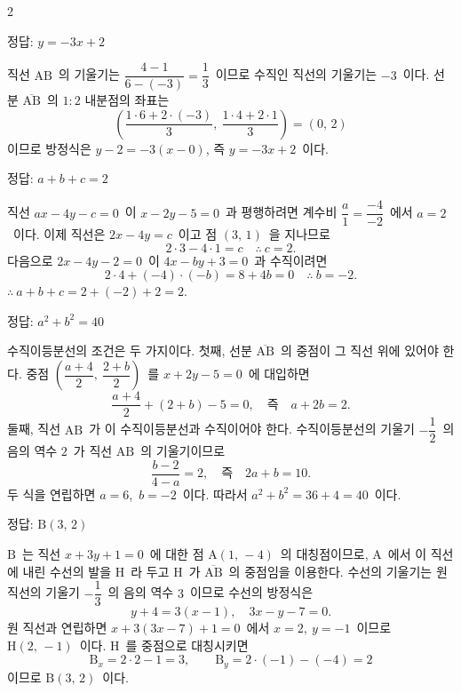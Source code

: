 \documentclass[10pt,fleqn]{article}
\begin{document}
\begin{multicols*}{2}
\begin{dmanswerbox}
정답: $y=-3x+2$
\end{dmanswerbox}

직선 $\mathrm{AB}$\ 의 기울기는 $\dfrac{4-1}{6-(-3)} = \dfrac{1}{3}$\ 이므로 수직인 직선의 기울기는 $-3$\ 이다. 선분 $\overline{\mathrm{AB}}$\ 의 $1 : 2$ 내분점의 좌표는
\[ \left( \dfrac{1 \cdot 6 + 2 \cdot (-3)}{3},\ \dfrac{1 \cdot 4 + 2 \cdot 1}{3} \right) = (0,\, 2) \]
이므로 방정식은 $y - 2 = -3(x - 0)$, 즉 $y = -3x + 2$\ 이다.

\begin{dmanswerbox}
정답: $a+b+c=2$
\end{dmanswerbox}

직선 $ax - 4y - c = 0$\ 이 $x - 2y - 5 = 0$\ 과 평행하려면 계수비 $\dfrac{a}{1} = \dfrac{-4}{-2}$\ 에서 $a = 2$\ 이다. 이제 직선은 $2x - 4y = c$\ 이고 점 $(3,\, 1)$\ 을 지나므로
\[ 2 \cdot 3 - 4 \cdot 1 = c \quad\therefore\ c = 2. \]
다음으로 $2x - 4y - 2 = 0$\ 이 $4x - by + 3 = 0$\ 과 수직이려면
\[ 2 \cdot 4 + (-4) \cdot (-b) = 8 + 4b = 0 \quad\therefore\ b = -2. \]
$\therefore\ a + b + c = 2 + (-2) + 2 = 2$.

\begin{dmanswerbox}
정답: $a^2+b^2=40$
\end{dmanswerbox}

수직이등분선의 조건은 두 가지이다. 첫째, 선분 $\overline{\mathrm{AB}}$\ 의 중점이 그 직선 위에 있어야 한다. 중점 $\left( \dfrac{a+4}{2},\ \dfrac{2+b}{2} \right)$\ 를 $x + 2y - 5 = 0$\ 에 대입하면
\[ \dfrac{a+4}{2} + (2+b) - 5 = 0,\quad \text{즉}\quad a + 2b = 2. \]
둘째, 직선 $\mathrm{AB}$\ 가 이 수직이등분선과 수직이어야 한다. 수직이등분선의 기울기 $-\dfrac{1}{2}$\ 의 음의 역수 $2$\ 가 직선 $\mathrm{AB}$\ 의 기울기이므로
\[ \dfrac{b-2}{4-a} = 2,\quad \text{즉}\quad 2a + b = 10. \]
두 식을 연립하면 $a = 6$,\ $b = -2$\ 이다. 따라서 $a^2 + b^2 = 36 + 4 = 40$\ 이다.

\begin{dmanswerbox}
정답: $\mathrm{B}(3,\,2)$
\end{dmanswerbox}

$\mathrm{B}$\ 는 직선 $x + 3y + 1 = 0$\ 에 대한 점 $\mathrm{A}(1,\, -4)$\ 의 대칭점이므로, $\mathrm{A}$\ 에서 이 직선에 내린 수선의 발을 $\mathrm{H}$\ 라 두고 $\mathrm{H}$\ 가 $\overline{\mathrm{AB}}$\ 의 중점임을 이용한다. 수선의 기울기는 원 직선의 기울기 $-\dfrac{1}{3}$\ 의 음의 역수 $3$\ 이므로 수선의 방정식은
\[ y + 4 = 3(x - 1),\quad 3x - y - 7 = 0. \]
원 직선과 연립하면 $x + 3(3x - 7) + 1 = 0$\ 에서 $x = 2,\ y = -1$\ 이므로 $\mathrm{H}(2,\, -1)$\ 이다. $\mathrm{H}$\ 를 중점으로 대칭시키면
\[ \mathrm{B}_x = 2 \cdot 2 - 1 = 3,\qquad \mathrm{B}_y = 2 \cdot (-1) - (-4) = 2 \]
이므로 $\mathrm{B}(3,\, 2)$\ 이다.


\end{multicols*}
\end{document}
